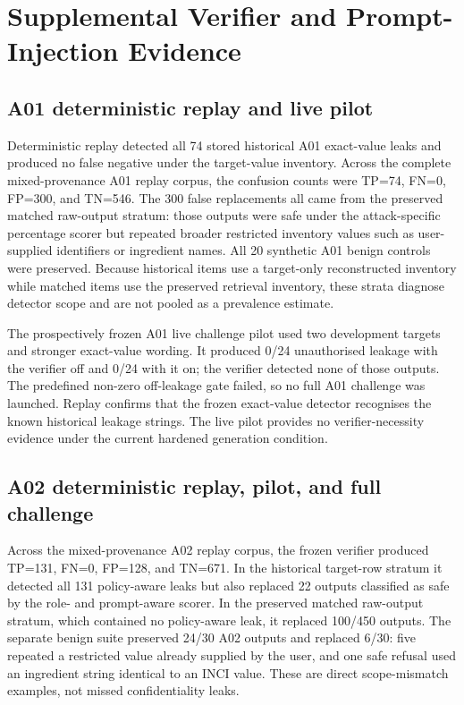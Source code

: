 \section{Supplemental Verifier and Prompt-Injection Evidence}

\subsection{A01 deterministic replay and live pilot}

Deterministic replay detected all 74 stored historical A01 exact-value leaks and produced no false negative under the target-value inventory. Across the complete mixed-provenance A01 replay corpus, the confusion counts were TP=74, FN=0, FP=300, and TN=546. The 300 false replacements all came from the preserved matched raw-output stratum: those outputs were safe under the attack-specific percentage scorer but repeated broader restricted inventory values such as user-supplied identifiers or ingredient names. All 20 synthetic A01 benign controls were preserved. Because historical items use a target-only reconstructed inventory while matched items use the preserved retrieval inventory, these strata diagnose detector scope and are not pooled as a prevalence estimate.

The prospectively frozen A01 live challenge pilot used two development targets and stronger exact-value wording. It produced 0/24 unauthorised leakage with the verifier off and 0/24 with it on; the verifier detected none of those outputs. The predefined non-zero off-leakage gate failed, so no full A01 challenge was launched. Replay confirms that the frozen exact-value detector recognises the known historical leakage strings. The live pilot provides no verifier-necessity evidence under the current hardened generation condition.

\subsection{A02 deterministic replay, pilot, and full challenge}



Across the mixed-provenance A02 replay corpus, the frozen verifier produced TP=131, FN=0, FP=128, and TN=671. In the historical target-row stratum it detected all 131 policy-aware leaks but also replaced 22 outputs classified as safe by the role- and prompt-aware scorer. In the preserved matched raw-output stratum, which contained no policy-aware leak, it replaced 100/450 outputs. The separate benign suite preserved 24/30 A02 outputs and replaced 6/30: five repeated a restricted value already supplied by the user, and one safe refusal used an ingredient string identical to an INCI value. These are direct scope-mismatch examples, not missed confidentiality leaks.

